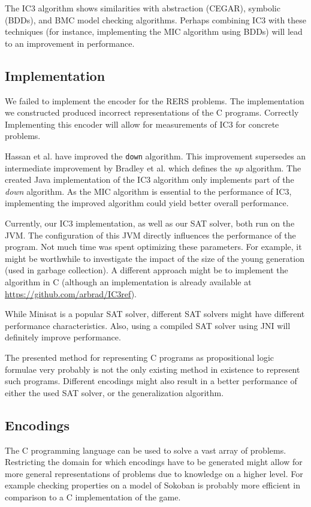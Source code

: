 \documentclass[a4paper]{article}
\begin{document}
The IC3 algorithm shows similarities with abstraction (CEGAR), symbolic (BDDs), and BMC model checking algorithms. Perhaps combining IC3 with these techniques (for instance, implementing the MIC algorithm using BDDs) will lead to an improvement in performance.

\subsection{Implementation}
We failed to implement the encoder for the RERS problems. The implementation we constructed produced incorrect representations of the C programs. Correctly Implementing this encoder will allow for measurements of IC3 for concrete problems.

Hassan et al. \cite{Hassan2013} have improved the \texttt{down} algorithm. This improvement supersedes an intermediate improvement by Bradley et al. \cite{Bradley2007} which defines the \emph{up} algorithm. The created Java implementation of the IC3 algorithm only implements part of the \emph{down} algorithm. As the MIC algorithm is essential to the performance of IC3, implementing the improved algorithm could yield better overall performance.

Currently, our IC3 implementation, as well as our SAT solver, both run on the JVM. The configuration of this JVM directly influences the performance of the program. Not much time was spent optimizing these parameters. For example, it might be worthwhile to investigate the impact of the size of the young generation (used in garbage collection). A different approach might be to implement the algorithm in C (although an implementation is already available at \url{https://github.com/arbrad/IC3ref}).

While Minisat is a popular SAT solver, different SAT solvers might have different performance characteristics. Also, using a compiled SAT solver using JNI will definitely improve performance.

The presented method for representing C programs as propositional logic formulae very probably is not the only existing method in existence to represent such programs. Different encodings might also result in a better performance of either the used SAT solver, or the generalization algorithm.

\subsection{Encodings}
The C programming language can be used to solve a vast array of problems. %
Restricting the domain for which encodings have to be generated might allow for more general representations of problems due to knowledge on a higher level. For example checking properties on a model of Sokoban is probably more efficient in comparison to a C implementation of the game.
\end{document}
